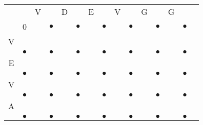 \documentclass[landscape]{foils}
\begin{document}
{
\normalsize
\begin{center}
\begin{tabular}{ccccccccccccccc}
   &              & V             &  & D & & E & & V & & G & & G \\   
   & {\color{black} 0}      &    & {\color{black} $\bullet$}        &    & {\color{black}$\bullet$} &    & {\color{black}$\bullet$}&    & {\color{black}$\bullet$}&    & {\color{black}$\bullet$}&    & {\color{black}$\bullet$} \\
V  & {\color{black} $$} &     & {\color{black} $$ } &     & {\color{black} $$ } & {\color{black} $$} &     & {\color{black} $$ } &     & {\color{black} $$ } & {\color{black} $$} &     & {\color{black} $$ } &       \\
   & {\color{black} $\bullet$}      &    & {\color{black} $\bullet$}        &    & {\color{black}$\bullet$} &    & {\color{black}$\bullet$}&    & {\color{black}$\bullet$}&    & {\color{black}$\bullet$}&    & {\color{black}$\bullet$} \\
E  & {\color{black} $$} &     & {\color{black} $$ } &     & {\color{black} $$ } & {\color{black} $$} &     & {\color{black} $$ } &     & {\color{black} $$ } & {\color{black} $$} &     & {\color{black} $$ } &       \\   & {\color{black} $\bullet$}      &    & {\color{black} $\bullet$}        &    & {\color{black}$\bullet$} &    & {\color{black}$\bullet$}&    & {\color{black}$\bullet$}&    & {\color{black}$\bullet$}&    & {\color{black}$\bullet$} \\
V  & {\color{black} $$} &     & {\color{black} $$ } &     & {\color{black} $$ } & {\color{black} $$} &     & {\color{black} $$ } &     & {\color{black} $$ } & {\color{black} $$} &     & {\color{black} $$ } &       \\   & {\color{black} $\bullet$}      &    & {\color{black} $\bullet$}        &    & {\color{black}$\bullet$} &    & {\color{black}$\bullet$}&    & {\color{black}$\bullet$}&    & {\color{black}$\bullet$}&    & {\color{black}$\bullet$} \\
A  & {\color{black} $$} &     & {\color{black} $$ } &     & {\color{black} $$ } & {\color{black} $$} &     & {\color{black} $$ } &     & {\color{black} $$ } & {\color{black} $$} &     & {\color{black} $$ } &       \\   & {\color{black} $\bullet$}      &    & {\color{black} $\bullet$}        &    & {\color{black}$\bullet$} &    & {\color{black}$\bullet$}&    & {\color{black}$\bullet$}&    & {\color{black}$\bullet$}&    & {\color{black}$\bullet$} \\

\end{tabular}
\end{center}}
\end{document}
